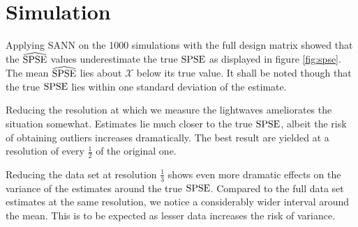 \section{Simulation}
\label{sec:simulation}
	
	
	
	
		Applying SANN on the 1000 simulations with the full design matrix showed that the $\widehat{\mathrm{SPSE}}$ values underestimate the true $\mathrm{SPSE}$ as displayed in figure \ref{fig:spse}.
		The mean $\widehat{\mathrm{SPSE}}$ lies about $\mathcal{X}$ below its true value.
		It shall be noted though that the true $\mathrm{SPSE}$ lies within one standard deviation of the estimate.
	
	
	
		Reducing the resolution at which we measure the lightwaves ameliorates the situation somewhat.
		Estimates lie much closer to the true $\mathrm{SPSE}$, albeit the risk of obtaining outliers increases dramatically.
		The best result are yielded at a resolution of every $\frac{1}{2}$ of the original one.
	
	
	
		Reducing the data set at resolution $\frac{1}{3}$ shows even more dramatic effects on the variance of the estimates around the true $\mathrm{SPSE}$.
		Compared to the full data set estimates at the same resolution, we notice a considerably wider interval around the mean.
		This is to be expected as lesser data increases the risk of variance.
	

